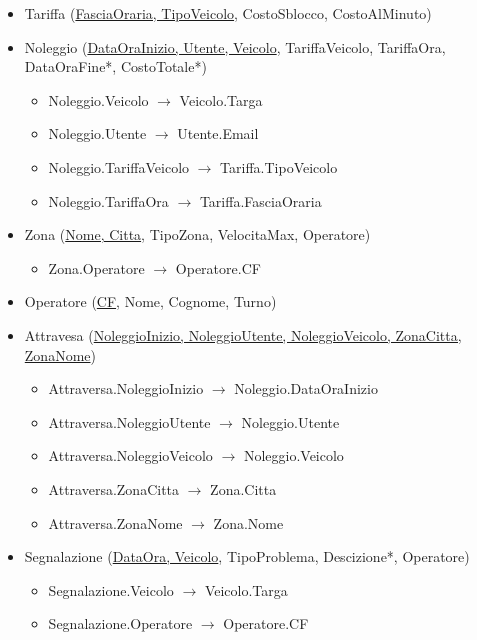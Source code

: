 \documentclass[11pt,a4paper]{article}
\begin{document}
\begin{itemize}
    \item Tariffa (\underline{FasciaOraria, TipoVeicolo}, CostoSblocco, CostoAlMinuto)

    \item Noleggio (\underline{DataOraInizio, Utente, Veicolo}, TariffaVeicolo, TariffaOra, DataOraFine*, CostoTotale*)
          \begin{itemize}
              \item Noleggio.Veicolo $\to$ Veicolo.Targa
              \item Noleggio.Utente $\to$ Utente.Email
              \item Noleggio.TariffaVeicolo $\to$ Tariffa.TipoVeicolo
              \item Noleggio.TariffaOra $\to$ Tariffa.FasciaOraria
          \end{itemize}

    \item Zona (\underline{Nome, Citta}, TipoZona, VelocitaMax, Operatore)
          \begin{itemize}
              \item Zona.Operatore $\to$ Operatore.CF
          \end{itemize}

    \item Operatore (\underline{CF}, Nome, Cognome, Turno)

    \item Attravesa (\underline{NoleggioInizio, NoleggioUtente, NoleggioVeicolo, ZonaCitta, ZonaNome})
          \begin{itemize}
              \item Attraversa.NoleggioInizio $\to$ Noleggio.DataOraInizio
              \item Attraversa.NoleggioUtente $\to$ Noleggio.Utente
              \item Attraversa.NoleggioVeicolo $\to$ Noleggio.Veicolo
              \item Attraversa.ZonaCitta $\to$ Zona.Citta
              \item Attraversa.ZonaNome $\to$ Zona.Nome
          \end{itemize}

    \item Segnalazione (\underline{DataOra, Veicolo}, TipoProblema, Descizione*, Operatore)
          \begin{itemize}
              \item Segnalazione.Veicolo $\to$ Veicolo.Targa
              \item Segnalazione.Operatore $\to$ Operatore.CF
          \end{itemize}


\end{itemize}
\end{document}
